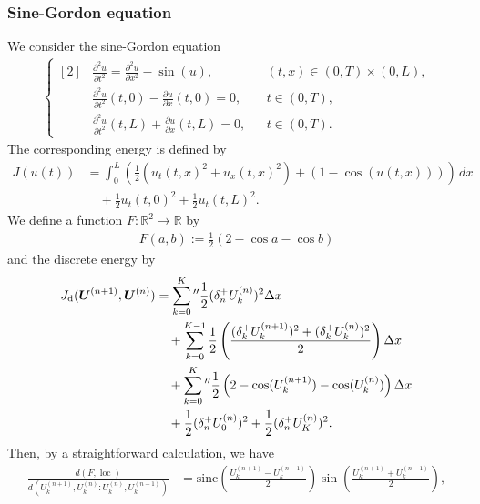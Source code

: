 \documentclass[dvipdfmx-if-dvi,autodetect-engine,ja=standard]{amsart}
\numberwithin{equation}{section} %
\def\vect#1{\mbox{\boldmath $#1$}} %
\DeclareMathOperator{\loc}{loc}
\begin{document}
\subsubsection{Sine-Gordon equation}
We consider the sine-Gordon equation
\begin{align}\label{eq:sdw:example:sineGordon}
    \left\{ \begin{aligned}[2]
    &\frac{\partial^2 u}{\partial t^2} = \frac{\partial^2 u}{\partial x^2} - \sin (u),
    &&(t,x) \in (0,T)\times (0,L),\\
    &\frac{\partial^2 u}{\partial t^2}(t,0)
    - \frac{\partial u}{\partial x}(t,0) = 0,
    &&t\in (0,T),\\
    &\frac{\partial^2 u}{\partial t^2}(t,L)
    + \frac{\partial u}{\partial x}(t,L) = 0,
    &&t\in (0,T).
    \end{aligned}\right.
\end{align}
The corresponding energy is defined by
\begin{align}
    J(u(t))
    &=
    \int_0^L \left(
    \frac{1}{2} \left( u_t(t,x)^2 + u_x(t,x)^2 \right)
    + (1-\cos (u(t,x)))
    \right)\,dx \\
    &\quad
    + \frac{1}{2}u_t(t,0)^2 + \frac{1}{2}u_t(t,L)^2.
\end{align}
We define a function
$F: \mathbb{R}^2 \to \mathbb{R}$
by
\begin{align}
    F(a,b) := \frac{1}{2} \left( 2- \cos a - \cos b \right)
\end{align}
and the discrete energy by
\begin{align}
    J_{\mathrm{d}} (\vect{U}^{(n+1)}, \vect{U}^{(n)})
    &=
    \sum_{k=0}^K{}'' \frac{1}{2} (\delta_n^+ U_k^{(n)})^2 \Delta x \\
    &\quad +
    \sum_{k=0}^{K-1} 
    \frac{1}{2}
    \left(
        \frac{(\delta_k^+ U_k^{(n+1)})^2 + (\delta_k^+ U_k^{(n)})^2}{2}
    \right)
    \Delta x \\
    &\quad + \sum_{k=0}^K{}'' \frac{1}{2}\left(2- \cos (U_k^{(n+1)}) - \cos (U_k^{(n)}) \right) \Delta x \\
    &\quad
    + \frac{1}{2} (\delta_n^+ U_0^{(n)})^2
    + \frac{1}{2} (\delta_n^+ U_K^{(n)})^2.
\end{align}
Then, by a straightforward calculation,
we have
\begin{align}
    \frac{d(F,\loc)}{d(U_k^{(n+1)}, U_k^{(n)} : U_k^{(n)}, U_k^{(n-1)})}
    &=
    \mathrm{sinc} \left( \frac{U_k^{(n+1)}-U_k^{(n-1)}}{2} \right)
    \sin \left( \frac{U_k^{(n+1)}+U_k^{(n-1)}}{2} \right),
\end{align}
\end{document}
